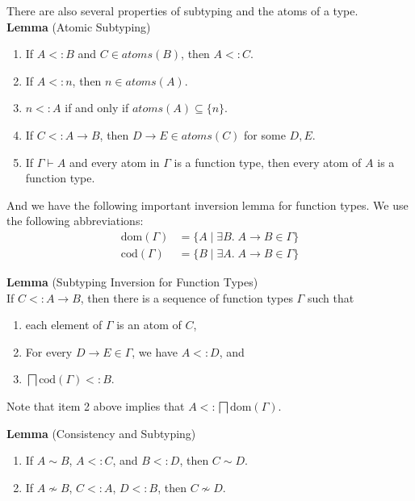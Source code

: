 \documentclass{article}
\newcommand{\ATOMS}[1]{\mathit{atoms}(#1)}
\begin{document}
There are also several properties of subtyping and the atoms of a type.\\

\noindent \textbf{Lemma} (Atomic Subtyping)
\begin{enumerate}
\item If $A <: B$ and $C \in \ATOMS{B}$, then $A <: C$.
\item If $A <: n$, then $n \in \ATOMS{A}$.
\item $n <: A$ if and only if $\ATOMS{A} \subseteq \{ n \}$.
\item If $C <: A \to B$, then $D\to E \in \ATOMS{C}$ for some $D,E$.
\item If $\Gamma \vdash A$ and every atom in $\Gamma$ is a function type,
  then every atom of $A$ is a function type.
\end{enumerate}

And we have the following important inversion lemma for function
types. We use the following abbreviations:
\begin{align*}
  \mathrm{dom}(\Gamma) &= \{ A \mid \exists B.\; A \to B \in \Gamma \}\\
  \mathrm{cod}(\Gamma) &= \{ B \mid \exists A.\; A \to B \in \Gamma \}
\end{align*}

\noindent \textbf{Lemma} (Subtyping Inversion for Function Types)\\
%
If $C <: A \to B$, then there is a sequence of function types $\Gamma$
such that
\begin{enumerate}
\item each element of $\Gamma$ is an atom of $C$,
\item For every $D\to E \in \Gamma$, we have $A <: D$, and
\item $\bigsqcap \mathrm{cod}(\Gamma) <: B$.
\end{enumerate}
Note that item 2 above implies that $A <: \bigsqcap \mathrm{dom}(\Gamma)$.

\noindent \textbf{Lemma} (Consistency and Subtyping)
\begin{enumerate}
\item  If $A \sim B$, $A <: C$, and $B <: D$,
  then $C \sim D$.
\item If $A \not\sim B$, $C <: A$, $D <: B$, then $C \not\sim D$.
\end{enumerate}
\end{document}
